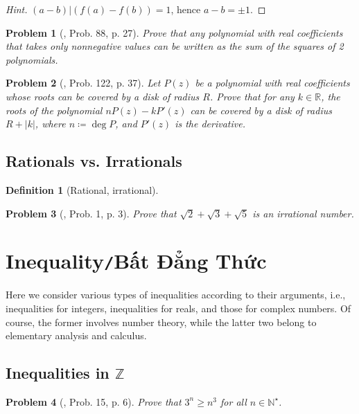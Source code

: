 \documentclass[oneside]{book}
\numberwithin{equation}{section}
\newtheorem{definition}{Definition}[section]
\newtheorem{problem}{Problem}[section]
\begin{document}
\begin{proof}[Hint]
	$(a - b)|(f(a) - f(b)) = 1$, hence $a - b = \pm 1$.
\end{proof}

\begin{problem}[\cite{Gelca_Andreescu2017}, Prob. 88, p. 27]
	Prove that any polynomial with real coefficients that takes only nonnegative values can be written as the sum of the squares of 2 polynomials.
\end{problem}

\begin{problem}[\cite{Gelca_Andreescu2017}, Prob. 122, p. 37]
	Let $P(z)$ be a polynomial with real coefficients whose roots can be covered by a disk of radius $R$. Prove that for any $k\in\mathbb{R}$, the roots of the polynomial $nP(z) - kP'(z)$ can be covered by a disk of radius $R + |k|$, where $n\coloneqq\deg P$, and $P'(z)$ is the derivative.
\end{problem}

\subsection{Rationals vs. Irrationals}
\begin{definition}[Rational, irrational]
	
\end{definition}
\begin{problem}[\cite{Gelca_Andreescu2017}, Prob. 1, p. 3]
	Prove that $\sqrt{2} + \sqrt{3} + \sqrt{5}$ is an irrational number.
\end{problem}

\section{Inequality\texttt{/}Bất Đẳng Thức}
Here we consider various types of inequalities according to their arguments, i.e., inequalities for integers, inequalities for reals, and those for complex numbers. Of course, the former involves number theory, while the latter two belong to elementary analysis and calculus.

\subsection{Inequalities in $\mathbb{Z}$}

\begin{problem}[\cite{Gelca_Andreescu2017}, Prob. 15, p. 6]
	Prove that $3^n\ge n^3$ for all $n\in\mathbb{N}^\star$.
\end{problem}
\end{document}
